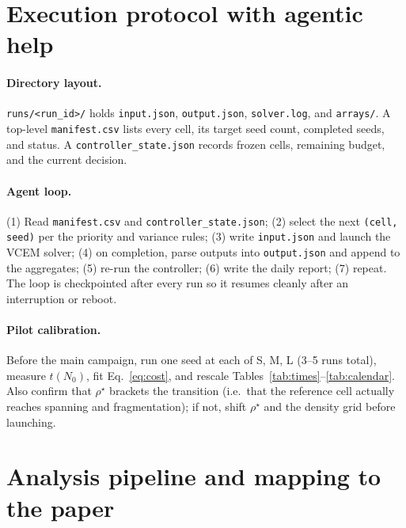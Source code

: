 \documentclass[11pt]{article}
\newcommand{\rhostar}{\rho^{\star}}
\begin{document}
\section{Execution protocol with agentic help}
\label{sec:execution}

\paragraph{Directory layout.}
\texttt{runs/<run\_id>/} holds \texttt{input.json}, \texttt{output.json},
\texttt{solver.log}, and \texttt{arrays/}. A top-level \texttt{manifest.csv} lists every
cell, its target seed count, completed seeds, and status. A \texttt{controller\_state.json}
records frozen cells, remaining budget, and the current decision.

\paragraph{Agent loop.}
(1) Read \texttt{manifest.csv} and \texttt{controller\_state.json};
(2) select the next \texttt{(cell, seed)} per the priority and variance rules;
(3) write \texttt{input.json} and launch the VCEM solver;
(4) on completion, parse outputs into \texttt{output.json} and append to the aggregates;
(5) re-run the controller; (6) write the daily report; (7) repeat. The loop is
checkpointed after every run so it resumes cleanly after an interruption or reboot.

\paragraph{Pilot calibration.}
\label{sec:pilot}
Before the main campaign, run one seed at each of S, M, L (3--5 runs total), measure
$t(N_0)$, fit Eq.~\eqref{eq:cost}, and rescale Tables~\ref{tab:times}--\ref{tab:calendar}.
Also confirm that $\rhostar$ brackets the transition (i.e.\ that the reference cell
actually reaches spanning and fragmentation); if not, shift $\rhostar$ and the
density grid before launching.

\section{Analysis pipeline and mapping to the paper}
\label{sec:analysis}
\end{document}
